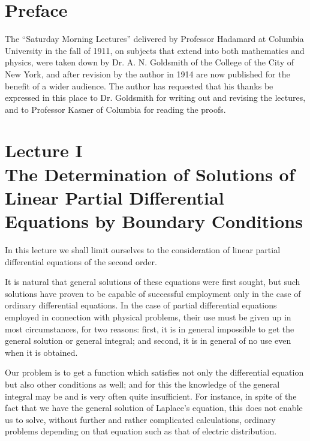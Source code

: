\documentclass[12pt,oneside]{book}
\begin{document}
\pagebreak \chapter{Preface} \noindent The ``Saturday Morning Lectures''
delivered by Professor Hadamard at Columbia University in the fall of 1911, on
subjects that extend into both mathematics and physics, were taken down by Dr.
A. N. Goldsmith of the College of the City of New York, and after revision by
the author in 1914 are now published for the benefit of a wider audience. The
author has requested that his thanks be expressed in this place to Dr. Goldsmith
for writing out and revising the lectures, and to Professor Kasner of Columbia
for reading the proofs. \par

\tableofcontents

\mainmatter

\chapter[Lecture I]{Lecture I\\ The Determination of Solutions of Linear Partial
Differential Equations by Boundary Conditions}

\vspace*{-\baselineskip} In this lecture we shall limit ourselves to the
consideration of linear partial differential equations of the second order. \par

It is natural that general solutions of these equations were first sought, but
such solutions have proven to be capable of successful employment only in the
case of ordinary differential equations.  In the case of partial differential
equations employed in connection with physical problems, their use must be
given up in most circumstances, for two reasons: first, it is in general
impossible to get the general solution or general integral; and second, it is in
general of no use even when it is obtained. \par

Our problem is to get a function which satisfies not only the differential
equation but also other conditions as well; and for this the knowledge of the
general integral may be and is very often quite insufficient. For instance, in
spite of the fact that we have the general solution of Laplace's equation, this
does not enable us to solve, without further and rather complicated
calculations, ordinary problems depending on that equation such as that of
electric distribution. \par
\end{document}
